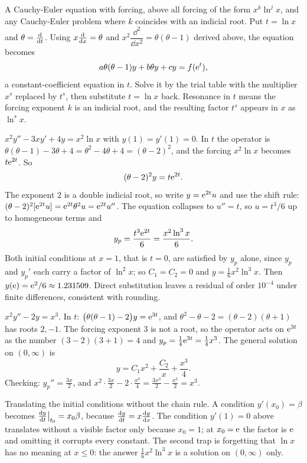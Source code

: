 \cue A Cauchy-Euler equation with forcing, above all forcing of the form $x^{k}\ln^{j}x$, and any Cauchy-Euler problem where $k$ coincides with an indicial root.
\method Put $t=\ln x$ and $\theta=\frac{\mathrm{d}}{\mathrm{d}t}$. Using $x\frac{\mathrm{d}}{\mathrm{d}x}=\theta$ and $x^{2}\dfrac{\dd^{2}}{\dd x^{2}}=\theta(\theta-1)$ derived above, the equation becomes
\[a\theta(\theta-1)y+b\theta y+cy=f(\mathrm{e}^{t}),\]
a constant-coefficient equation in $t$. Solve it by the trial table with the multiplier $x^{s}$ replaced by $t^{s}$, then substitute $t=\ln x$ back. Resonance in $t$ means the forcing exponent $k$ is an indicial root, and the resulting factor $t^{s}$ appears in $x$ as $\ln^{s}x$.

\begin{worked}
$x^{2}y''-3xy'+4y=x^{2}\ln x$ with $y(1)=y'(1)=0$. In $t$ the operator is $\theta(\theta-1)-3\theta+4=\theta^{2}-4\theta+4=(\theta-2)^{2}$, and the forcing $x^{2}\ln x$ becomes $t\mathrm{e}^{2t}$. So
\[(\theta-2)^{2}y=t\mathrm{e}^{2t}.\]
The exponent $2$ is a double indicial root, so write $y=\mathrm{e}^{2t}u$ and use the shift rule: $(\theta-2)^{2}[\mathrm{e}^{2t}u]=\mathrm{e}^{2t}\theta^{2}u=\mathrm{e}^{2t}u''$. The equation collapses to $u''=t$, so $u=t^{3}/6$ up to homogeneous terms and
\[y_p=\frac{t^{3}\mathrm{e}^{2t}}{6}=\frac{x^{2}\ln^{3}x}{6}.\]
Both initial conditions at $x=1$, that is $t=0$, are satisfied by $y_p$ alone, since $y_p$ and $y_p'$ each carry a factor of $\ln^{2}x$; so $C_1=C_2=0$ and $y=\tfrac16x^{2}\ln^{3}x$. Then $y(\mathrm{e})=\mathrm{e}^{2}/6\approx1.231509$. Direct substitution leaves a residual of order $10^{-4}$ under finite differences, consistent with rounding.
\end{worked}

\begin{worked}
$x^{2}y''-2y=x^{3}$. In $t$: $\bigl(\theta(\theta-1)-2\bigr)y=\mathrm{e}^{3t}$, and $\theta^{2}-\theta-2=(\theta-2)(\theta+1)$ has roots $2,-1$. The forcing exponent $3$ is not a root, so the operator acts on $\mathrm{e}^{3t}$ as the number $(3-2)(3+1)=4$ and $y_p=\tfrac14\mathrm{e}^{3t}=\tfrac14x^{3}$. The general solution on $(0,\infty)$ is
\[y=C_1x^{2}+\frac{C_2}{x}+\frac{x^{3}}{4}.\]
Checking: $y_p''=\tfrac{3x}{2}$, and $x^{2}\cdot\tfrac{3x}{2}-2\cdot\tfrac{x^{3}}{4}=\tfrac{3x^{3}}{2}-\tfrac{x^{3}}{2}=x^{3}$.
\end{worked}

\begin{trap}
Translating the initial conditions without the chain rule. A condition $y'(x_0)=\beta$ becomes $\frac{\mathrm{d}y}{\mathrm{d}t}\big|_{t_0}=x_0\beta$, because $\frac{\mathrm{d}y}{\mathrm{d}t}=x\frac{\mathrm{d}y}{\mathrm{d}x}$. The condition $y'(1)=0$ above translates without a visible factor only because $x_0=1$; at $x_0=\mathrm{e}$ the factor is $\mathrm{e}$ and omitting it corrupts every constant. The second trap is forgetting that $\ln x$ has no meaning at $x\le0$: the answer $\tfrac16x^{2}\ln^{3}x$ is a solution on $(0,\infty)$ only.
\end{trap}

